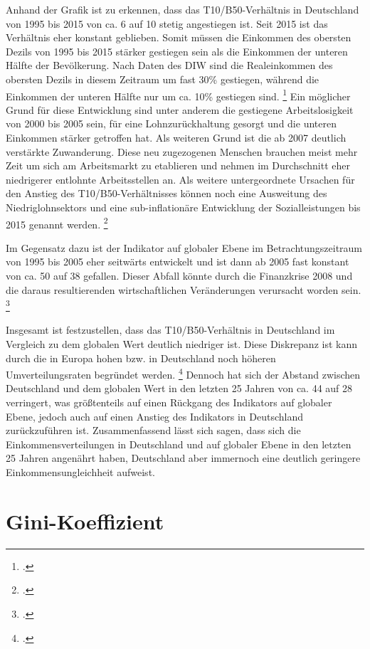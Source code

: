Anhand der Grafik ist zu erkennen, dass das T10/B50-Verhältnis in Deutschland von 1995 bis 2015 von ca. 6 auf 10 stetig angestiegen ist.  Seit 2015 ist das Verhältnis eher konstant geblieben. Somit müssen die Einkommen des obersten Dezils von 1995 bis 2015 stärker gestiegen sein als die Einkommen der unteren Hälfte der Bevölkerung. Nach Daten des DIW sind die Realeinkommen des obersten Dezils in diesem Zeitraum um fast 30\% gestiegen, während die Einkommen der unteren Hälfte nur um ca. 10\% gestiegen sind. \footcite[Vgl.][S. 452]{grabka_einkommensverteilung_2018} Ein möglicher Grund für diese Entwicklung sind unter anderem die gestiegene Arbeitslosigkeit von 2000 bis 2005 sein, für eine Lohnzurückhaltung gesorgt und die unteren Einkommen stärker getroffen hat. Als weiteren Grund ist die ab 2007 deutlich verstärkte Zuwanderung. Diese neu zugezogenen Menschen brauchen meist mehr Zeit um sich am Arbeitsmarkt zu etablieren und nehmen im Durchschnitt eher niedrigerer entlohnte Arbeitsstellen an. Als weitere untergeordnete Ursachen für den Anstieg des T10/B50-Verhältnisses können noch eine Ausweitung des Niedriglohnsektors und eine sub-inflationäre Entwicklung der Sozialleistungen bis 2015 genannt werden. \footcite[Vgl.][S. 453f]{grabka_einkommensverteilung_2018}

Im Gegensatz dazu ist der Indikator auf globaler Ebene im Betrachtungszeitraum von 1995 bis 2005 eher seitwärts entwickelt und ist dann ab 2005 fast konstant von ca. 50 auf 38 gefallen. Dieser Abfall könnte durch die Finanzkrise 2008 und die daraus resultierenden wirtschaftlichen Veränderungen verursacht worden sein. \footcite[Vgl.][S. 55]{wir_2022}

Insgesamt ist festzustellen, dass das T10/B50-Verhältnis in Deutschland im Vergleich zu dem globalen Wert deutlich niedriger ist. Diese Diskrepanz ist kann durch die in Europa hohen bzw. in Deutschland noch höheren Umverteilungsraten begründet werden. \footcite[Vgl.][S. 36f]{wir_2022} Dennoch hat sich der Abstand zwischen Deutschland und dem globalen Wert in den letzten 25 Jahren von ca. 44 auf 28 verringert, was größtenteils auf einen Rückgang des Indikators auf globaler Ebene, jedoch auch auf einen Anstieg des Indikators in Deutschland zurückzuführen ist. Zusammenfassend lässt sich sagen, dass sich die Einkommensverteilungen in Deutschland und auf globaler Ebene in den letzten 25 Jahren angenährt haben, Deutschland aber immernoch eine deutlich geringere Einkommensungleichheit aufweist.

\section{Gini-Koeffizient}

